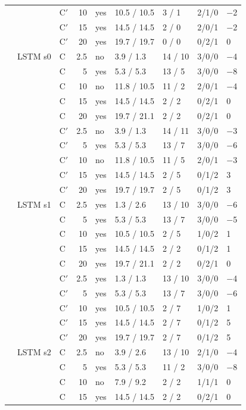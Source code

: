 \begin{scriptsize}
\begin{longtable}{lllrlllll}
 &  & C$'$ & 10 & yes & 10.5 / 10.5 & 3 / 1 & 2/1/0 & $-$2 \\
 &  & C$'$ & 15 & yes & 14.5 / 14.5 & 2 / 0 & 2/0/1 & $-$2 \\
 &  & C$'$ & 20 & yes & 19.7 / 19.7 & 0 / 0 & 0/2/1 & 0 \\
 & LSTM s0 & C & 2.5 & no & 3.9 / 1.3 & 14 / 10 & 3/0/0 & $-$4 \\
 &  & C & 5 & yes & 5.3 / 5.3 & 13 / 5 & 3/0/0 & $-$8 \\
 &  & C & 10 & no & 11.8 / 10.5 & 11 / 2 & 2/0/1 & $-$4 \\
 &  & C & 15 & yes & 14.5 / 14.5 & 2 / 2 & 0/2/1 & 0 \\
 &  & C & 20 & yes & 19.7 / 21.1 & 2 / 2 & 0/2/1 & 0 \\
 &  & C$'$ & 2.5 & no & 3.9 / 1.3 & 14 / 11 & 3/0/0 & $-$3 \\
 &  & C$'$ & 5 & yes & 5.3 / 5.3 & 13 / 7 & 3/0/0 & $-$6 \\
 &  & C$'$ & 10 & no & 11.8 / 10.5 & 11 / 5 & 2/0/1 & $-$3 \\
 &  & C$'$ & 15 & yes & 14.5 / 14.5 & 2 / 5 & 0/1/2 & 3 \\
 &  & C$'$ & 20 & yes & 19.7 / 19.7 & 2 / 5 & 0/1/2 & 3 \\
 & LSTM s1 & C & 2.5 & yes & 1.3 / 2.6 & 13 / 10 & 3/0/0 & $-$6 \\
 &  & C & 5 & yes & 5.3 / 5.3 & 13 / 7 & 3/0/0 & $-$5 \\
 &  & C & 10 & yes & 10.5 / 10.5 & 2 / 5 & 1/0/2 & 1 \\
 &  & C & 15 & yes & 14.5 / 14.5 & 2 / 2 & 0/1/2 & 1 \\
 &  & C & 20 & yes & 19.7 / 21.1 & 2 / 2 & 0/2/1 & 0 \\
 &  & C$'$ & 2.5 & yes & 1.3 / 1.3 & 13 / 10 & 3/0/0 & $-$4 \\
 &  & C$'$ & 5 & yes & 5.3 / 5.3 & 13 / 7 & 3/0/0 & $-$6 \\
 &  & C$'$ & 10 & yes & 10.5 / 10.5 & 2 / 7 & 1/0/2 & 1 \\
 &  & C$'$ & 15 & yes & 14.5 / 14.5 & 2 / 7 & 0/1/2 & 5 \\
 &  & C$'$ & 20 & yes & 19.7 / 19.7 & 2 / 7 & 0/1/2 & 5 \\
 & LSTM s2 & C & 2.5 & no & 3.9 / 2.6 & 13 / 10 & 2/1/0 & $-$4 \\
 &  & C & 5 & yes & 5.3 / 5.3 & 11 / 2 & 3/0/0 & $-$8 \\
 &  & C & 10 & no & 7.9 / 9.2 & 2 / 2 & 1/1/1 & 0 \\
 &  & C & 15 & yes & 14.5 / 14.5 & 2 / 2 & 0/2/1 & 0 \\

\end{longtable}
\end{scriptsize}
